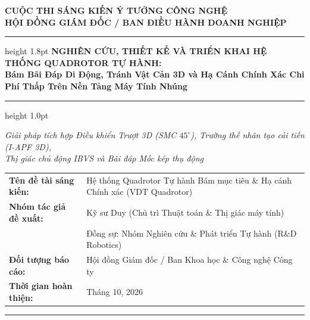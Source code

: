 \documentclass[12pt,a4paper]{article}
\begin{document}

\begin{center}
    {\large \textbf{CUỘC THI SÁNG KIẾN Ý TƯỞNG CÔNG NGHỆ}}\\[0.4em]
    {\large \textbf{HỘI ĐỒNG GIÁM ĐỐC / BAN ĐIỀU HÀNH DOANH NGHIỆP}}\\[1.2em]
    
    \hrule height 1.8pt \vspace{0.8em}
    {\LARGE \textbf{\color{primaryblue}NGHIÊN CỨU, THIẾT KẾ VÀ TRIỂN KHAI HỆ THỐNG QUADROTOR TỰ HÀNH:}}\\[0.4em]
    {\Large \textbf{\color{secondaryblue}Bám Bãi Đáp Di Động, Tránh Vật Cản 3D và Hạ Cánh Chính Xác Chi Phí Thấp Trên Nền Tảng Máy Tính Nhúng}}\\[0.8em]
    \hrule height 1.0pt \vspace{1.2em}
    
    {\large \textit{Giải pháp tích hợp Điều khiển Trượt 3D (SMC $45^\circ$), Trường thế nhân tạo cải tiến (I-APF 3D),\\Thị giác chủ động IBVS và Bãi đáp Mốc kép thụ động}}
    \vspace{1.5em}
\end{center}

\noindent
\begin{tabular}{ll}
    \textbf{Tên đề tài sáng kiến:} & Hệ thống Quadrotor Tự hành Bám mục tiêu \& Hạ cánh Chính xác (VDT Quadrotor) \\
    \textbf{Nhóm tác giả đề xuất:} & Kỹ sư Duy (Chủ trì Thuật toán \& Thị giác máy tính) \\
    & Đồng sự: Nhóm Nghiên cứu \& Phát triển Tự hành (R\&D Robotics) \\
    \textbf{Đối tượng báo cáo:} & Hội đồng Giám đốc / Ban Khoa học \& Công nghệ Công ty \\
    \textbf{Thời gian hoàn thiện:} & Tháng 10, 2026
\end{tabular}

\vspace{1.0em}
\hrule
\vspace{1.5em}

\end{document}
